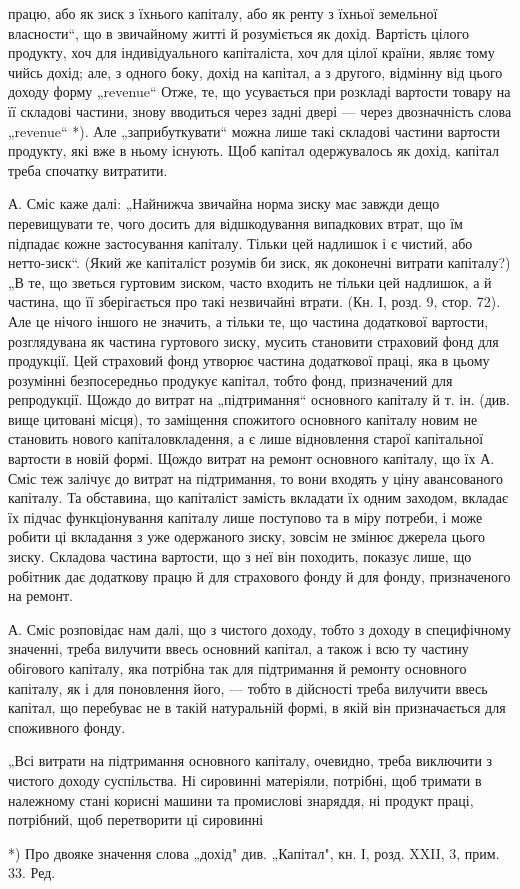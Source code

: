 працю, або як зиск з їхнього капіталу, або як ренту з їхньої земельної
власности“, що в звичайному житті й розуміється як дохід. Вартість
цілого продукту, хоч для індивідуального капіталіста, хоч для цілої країни,
являє тому чийсь дохід; але, з одного боку, дохід на капітал, а з другого,
відмінну від цього доходу форму „revenue“ Отже, те, що усувається при
розкладі вартости товару на її складові частини, знову вводиться через
задні двері — через двозначність слова „revenue“ *). Але „заприбуткувати“
можна лише такі складові частини вартости продукту, які вже в ньому
існують. Щоб капітал одержувалось як дохід, капітал треба спочатку
витратити.

А. Сміс каже далі: „Найнижча звичайна норма зиску має завжди
дещо перевищувати те, чого досить для відшкодування випадкових втрат,
що їм підпадає кожне застосування капіталу. Тільки цей надлишок і є
чистий, або нетто-зиск“. (Який же капіталіст розумів би зиск, як
доконечні витрати капіталу?) „В те, що зветься гуртовим зиском, часто
входить не тільки цей надлишок, а й частина, що її зберігається про
такі незвичайні втрати. (Кн. І, розд. 9, стор. 72). Але це нічого іншого
не значить, а тільки те, що частина додаткової вартости, розглядувана
як частина гуртового зиску, мусить становити страховий фонд для продукції.
Цей страховий фонд утворює частина додаткової праці, яка в
цьому розумінні безпосередньо продукує капітал, тобто фонд, призначений
для репродукції. Щождо до витрат на „підтримання“ основного
капіталу й т. ін. (див. вище цитовані місця), то заміщення спожитого
основного капіталу новим не становить нового капіталовкладення, а є
лише відновлення старої капітальної вартости в новій формі. Щождо
витрат на ремонт основного капіталу, що їх А. Сміс теж залічує до витрат
на підтримання, то вони входять у ціну авансованого капіталу.
Та обставина, що капіталіст замість вкладати їх одним заходом, вкладає
їх підчас функціонування капіталу лише поступово та в міру потреби,
і може робити ці вкладання з уже одержаного зиску, зовсім не змінює
джерела цього зиску. Складова частина вартости, що з неї він походить,
показує лише, що робітник дає додаткову працю й для страхового фонду
й для фонду, призначеного на ремонт.

А. Сміс розповідає нам далі, що з чистого доходу, тобто з доходу в
специфічному значенні, треба вилучити ввесь основний капітал, а також і
всю ту частину обігового капіталу, яка потрібна так для підтримання й
ремонту основного капіталу, як і для поновлення його, — тобто в дійсності
треба вилучити ввесь капітал, що перебуває не в такій натуральній
формі, в якій він призначається для споживного фонду.

„Всі витрати на підтримання основного капіталу, очевидно, треба
виключити з чистого доходу суспільства. Ні сировинні матеріяли, потрібні,
щоб тримати в належному стані корисні машини та промислові
знаряддя, ні продукт праці, потрібний, щоб перетворити ці сировинні

*) Про двояке значення слова „дохід" див. „Капітал", кн. І, розд. XXII, 3,
прим. 33. Ред.
